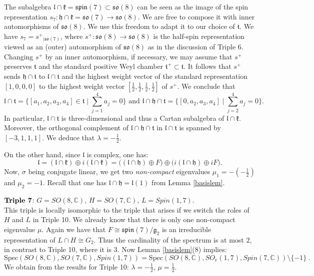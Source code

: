 \documentclass[10]{amsart}
\theoremstyle{remark}
\theoremstyle{definition}
\numberwithin{equation}{section}
\newcommand{\fg}{{\mathfrak g}}
\newcommand{\fspin}{{\mathfrak{spin}}}
\newcommand{\fh}{{\mathfrak h}}
\newcommand{\fk}{{\mathfrak k}}
\newcommand{\fl}{{\mathfrak l}}
\newcommand{\fo}{{\mathfrak{so}}}
\newcommand{\ft}{{\mathfrak t}}
\begin{document}
{The subalgebra $\fl\cap\fk=\fspin(7)\subset \fo(8)$ can be seen as the image of the spin representation $s_7:\fh\cap\fk=\fo(7)\rightarrow \fo(8)$. We are free to compose it with inner automorphisms
of $\fo(8)$. We use this freedom to adapt it to our choice of $\ft$. We have $s_7={s^+}_{|\fo(7)}$, where $s^+:\fo(8)\rightarrow \fo(8)$ is the half-spin representation
viewed as an (outer) automorphism of $\fo(8)$ as in the discussion of Triple 6. Changing $s^+$ by an inner automorphism, if necessary, we may assume that $s^+$
preserves $\ft$ and the standard positive Weyl chamber $\ft^+\subset\ft$. It follows that $s^+$ sends $\fh\cap\ft$ to $\fl\cap\ft$ and the highest weight vector of
the standard representation $[1,0,0,0]$ to the highest weight vector $[\frac{1}{2},\frac{1}{2},\frac{1}{2},\frac{1}{2}]$ of $s^+$. We conclude that
$$ \fl\cap\ft = \Big\{[a_1,a_2,a_3,a_4]\in{\mathfrak t}\mid\sum_{j=1}^{4}a_j=0\Big\}
\mbox{ and }
\fl\cap\fh\cap \ft = \Big\{[0,a_2,a_3,a_4]\mid\sum_{j=2}^4a_j=0\Big\}.$$
In particular, $\fl\cap\ft$ is three-dimensional and thus a Cartan subalgebra of $\fl\cap\fk$.
Moreover, the orthogonal complement of $\fl\cap\fh\cap \ft$ in $\fl\cap \ft$ is spanned by $[-3,1,1,1]$.
We deduce that $\lambda=-\frac{1}{2}$. 

On the other hand, since ${\mathfrak l}$ is complex, one has: 
$${\mathfrak l}=({\mathfrak l}\cap{\mathfrak k})\oplus i({\mathfrak l}\cap{\mathfrak k})=\big(({\mathfrak l}\cap{\mathfrak h})\oplus F\big)\oplus \big(i({\mathfrak l}\cap{\mathfrak h})\oplus iF\big).$$ 
Now, $\sigma$ being conjugate linear, we get two {\it non-compact} eigenvalues $\mu_1=-(-\frac{1}{2})$ and $\mu_2=-1$. Recall that one has ${\mathfrak l}\cap{\mathfrak h}={\mathfrak l}(1)$ from Lemma \ref{basislem}.
\vspace*{0.3cm}

\underline{$\text{\bf Triple 7}$}: $G=SO(8,\mathbb{C})$, $H=SO(7,\mathbb{C})$, $L=Spin(1,7)$.\\
This triple is locally isomorphic to the triple that arises if we switch the roles of $H$ and $L$ in Triple 10. We already know that there is only one non-compact eigenvalue $\mu$.
Again we have that $F\cong \fspin(7)/\fg_2$ is an irreducible representation of $L\cap H\cong G_2$. Thus the cardinality of the spectrum is at most $2$, in contrast to Triple 10, where it is
3. Now Lemma \ref{basislem}(8) implies:
$$\text{Spec}(SO(8,{\mathbb C}),SO(7,{\mathbb C}),Spin(1,7))=\text{Spec}(SO(8,\mathbb{C}),SO_e(1,7), Spin(7,{\mathbb C}))\setminus\{-1\}\ .$$
We obtain from the results for Triple 10:  $\lambda=-\frac{1}{2}$, $\mu=\frac{1}{2}$.
\vspace*{0.3cm}

}
\end{document}
